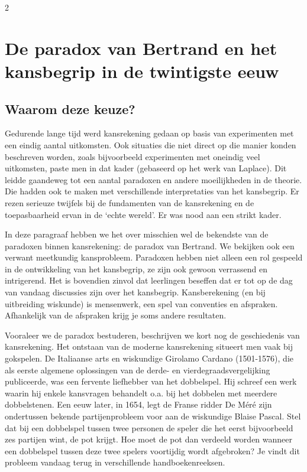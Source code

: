 \begin{multicols}{2}
	\section{De paradox van Bertrand en het kansbegrip in de twintigste eeuw}

	\subsection*{Waarom deze keuze?}
	
	Gedurende lange tijd werd kansrekening gedaan op basis van experimenten met een eindig aantal uitkomsten. Ook situaties die niet direct op die manier konden beschreven worden, zoals bijvoorbeeld experimenten met oneindig veel uitkomsten, paste men in dat kader (gebaseerd op het werk van Laplace). Dit leidde gaandeweg tot een aantal paradoxen en andere moeilijkheden in de theorie. Die hadden ook te maken met verschillende interpretaties van het kansbegrip. Er rezen serieuze twijfels bij de fundamenten van de kansrekening en de toepasbaarheid ervan in de `echte wereld'. Er was nood aan een strikt kader. 
	
	In deze paragraaf hebben we het over misschien wel de bekendste van de paradoxen binnen kansrekening: de paradox van Bertrand. We bekijken ook een verwant meetkundig kansprobleem. Paradoxen hebben niet alleen een rol gespeeld in de ontwikkeling van het kansbegrip, ze zijn ook gewoon verrassend en intrigerend. Het is bovendien zinvol dat leerlingen beseffen dat er tot op de dag van vandaag discussies zijn over het kansbegrip. Kansberekening (en bij uitbreiding wiskunde) is mensenwerk, een spel van conventies en afspraken. Afhankelijk van de afspraken krijg je soms andere resultaten.

	Vooraleer we de paradox bestuderen, beschrijven we kort nog de geschiedenis van  kansrekening. Het ontstaan van de moderne kansrekening situeert men vaak bij gokspelen. De Italiaanse arts en wiskundige Girolamo Cardano (1501-1576), die als eerste algemene oplossingen van de derde- en vierdegraadsvergelijking publiceerde, was een fervente liefhebber van het dobbelspel. Hij schreef een werk waarin hij enkele kansvragen behandelt o.a. bij het dobbelen met meerdere dobbelstenen. Een eeuw later, in 1654, legt de Franse ridder De Méré zijn ondertussen bekende partijenprobleem voor aan de wiskundige Blaise Pascal. Stel dat bij een dobbelspel tussen twee personen de speler die het eerst bijvoorbeeld zes partijen wint, de pot krijgt. Hoe moet de pot dan verdeeld worden wanneer een dobbelspel tussen deze twee spelers voortijdig wordt afgebroken? Je vindt dit probleem vandaag terug in verschillende handboekenreeksen. 
	

\end{multicols}
